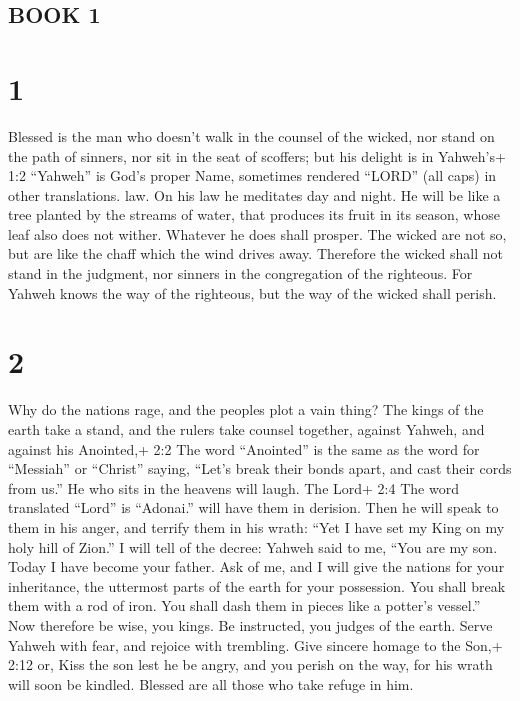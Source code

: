 \hypertarget{book-1}{%
\subsection{BOOK 1}\label{book-1}}

\hypertarget{section}{%
\section{1}\label{section}}

 Blessed is the man who doesn't walk in the counsel of the
wicked, nor stand on the path of sinners, nor sit in the seat of
scoffers;  but his delight is in Yahweh's+ 1:2 ``Yahweh'' is
God's proper Name, sometimes rendered ``LORD'' (all caps) in other
translations. law. On his law he meditates day and night. 
He will be like a tree planted by the streams of water, that produces
its fruit in its season, whose leaf also does not wither. Whatever he
does shall prosper.  The wicked are not so, but are like the
chaff which the wind drives away.  Therefore the wicked
shall not stand in the judgment, nor sinners in the congregation of the
righteous.  For Yahweh knows the way of the righteous, but
the way of the wicked shall perish.

\hypertarget{section-1}{%
\section{2}\label{section-1}}

 Why do the nations rage, and the peoples plot a vain thing?
 The kings of the earth take a stand, and the rulers take
counsel together, against Yahweh, and against his Anointed,+ 2:2 The
word ``Anointed'' is the same as the word for ``Messiah'' or ``Christ''
saying,  ``Let's break their bonds apart, and cast their
cords from us.''  He who sits in the heavens will laugh. The
Lord+ 2:4 The word translated ``Lord'' is ``Adonai.'' will have them in
derision.  Then he will speak to them in his anger, and
terrify them in his wrath:  ``Yet I have set my King on my
holy hill of Zion.''  I will tell of the decree: Yahweh said
to me, ``You are my son. Today I have become your father. 
Ask of me, and I will give the nations for your inheritance, the
uttermost parts of the earth for your possession.  You shall
break them with a rod of iron. You shall dash them in pieces like a
potter's vessel.''  Now therefore be wise, you kings. Be
instructed, you judges of the earth.  Serve Yahweh with
fear, and rejoice with trembling.  Give sincere homage to
the Son,+ 2:12 or, Kiss the son lest he be angry, and you perish on the
way, for his wrath will soon be kindled. Blessed are all those who take
refuge in him.

